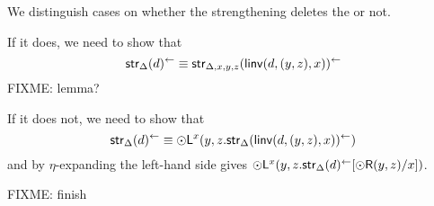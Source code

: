 \begin{enumerate}
\begin{itemize}
We distinguish cases on whether the strengthening deletes the \FL or
not.

If it does, we need to show that 
\[
\mathsf{str}_{\Delta}(d)^{\leftarrow}
\equiv 
\mathsf{str}_{\Delta,x,y,z}(\mathsf{linv}(d,(y,z),x))^{\leftarrow}
\]
FIXME: lemma? 

If it does not, we need to show that 
\[
\mathsf{str}_{\Delta}(d)^{\leftarrow}
\equiv 
\mathord{\odot}\mathsf{L}^{x}(y,z.\mathsf{str}_{\Delta}(\mathsf{linv}(d,(y,z),x))^{\leftarrow})
\]
and by $\eta$-expanding the left-hand side gives
$\mathord{\odot}\mathsf{L}^{x}(y,z.\mathsf{str}_{\Delta}(d)^{\leftarrow}[\mathord{\odot}\mathsf{R}(y,z)/x])$.

FIXME: finish


\end{itemize}

\end{enumerate}
